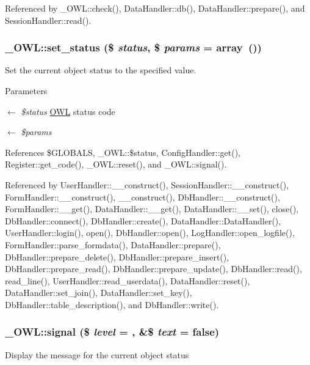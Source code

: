 Referenced by \_\-OWL::check(), DataHandler::db(), DataHandler::prepare(), and SessionHandler::read().

\subsubsection[{set\_\-status}]{\setlength{\rightskip}{0pt plus 5cm}\_\-OWL::set\_\-status (\$ {\em status}, \/  \$ {\em params} = {\ttfamily array~()})}\label{class__OWL_aea912d0ede9b3c2a69b79072d94d4787}
Set the current object status to the specified value.


\begin{DoxyParams}{Parameters}
\item[\mbox{$\leftarrow$} {\em \$status}]\hyperlink{classOWL}{OWL} status code \item[\mbox{$\leftarrow$} {\em \$params}]\end{DoxyParams}


References \$GLOBALS, \_\-OWL::\$status, ConfigHandler::get(), Register::get\_\-code(), \_\-OWL::reset(), and \_\-OWL::signal().



Referenced by UserHandler::\_\-\_\-construct(), SessionHandler::\_\-\_\-construct(), FormHandler::\_\-\_\-construct(), \_\-\_\-construct(), DbHandler::\_\-\_\-construct(), FormHandler::\_\-\_\-get(), DataHandler::\_\-\_\-get(), DataHandler::\_\-\_\-set(), close(), DbHandler::connect(), DbHandler::create(), DataHandler::DataHandler(), UserHandler::login(), open(), DbHandler::open(), LogHandler::open\_\-logfile(), FormHandler::parse\_\-formdata(), DataHandler::prepare(), DbHandler::prepare\_\-delete(), DbHandler::prepare\_\-insert(), DbHandler::prepare\_\-read(), DbHandler::prepare\_\-update(), DbHandler::read(), read\_\-line(), UserHandler::read\_\-userdata(), DataHandler::reset(), DataHandler::set\_\-join(), DataHandler::set\_\-key(), DbHandler::table\_\-description(), and DbHandler::write().

\subsubsection[{signal}]{\setlength{\rightskip}{0pt plus 5cm}\_\-OWL::signal (\$ {\em level} = {}, \/  \&\$ {\em text} = {\ttfamily false})}\label{class__OWL_a51ba4a16409acf2a2f61f286939091a5}
Display the message for the current object status


